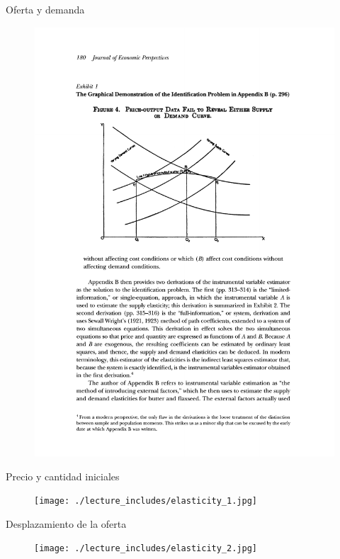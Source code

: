 \documentclass{beamer}
\begin{document}
\begin{frame}{Oferta y demanda}
	
	\begin{figure}
	\includegraphics[scale=0.72]{./lecture_includes/supply_demand.pdf}
	\end{figure}
\end{frame}


\begin{frame}{Precio y cantidad iniciales}

	\begin{figure}
	\texttt{[image: ./lecture\_includes/elasticity\_1.jpg]}
	\end{figure}
\end{frame}

\begin{frame}{Desplazamiento de la oferta}

	\begin{figure}
	\texttt{[image: ./lecture\_includes/elasticity\_2.jpg]}
	\end{figure}
\end{frame}
\end{document}
